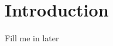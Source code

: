 \documentclass[../main.tex]{subfiles}
\begin{document}
\chapter{Introduction}
Fill me in later






\end{document}
